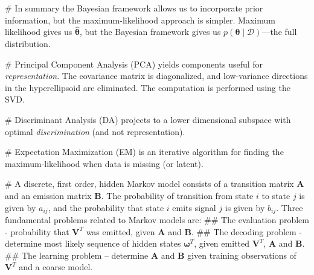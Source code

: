 \documentclass[12pt, a4paper]{article}
\newcommand{\D}{\mathcal{D}}
\newcommand{\vect}[1]{\bm{#1}}
\begin{document}
\begin{easylist}[itemize]
# In summary the Bayesian framework allows us to incorporate prior information, but the maximum-likelihood approach is simpler.
Maximum likelihood gives us $\hat{\vect{\theta}}$, but the Bayesian framework gives us $p(\vect{\theta}  \mid  \D)$---the full distribution.

# Principal Component Analysis (PCA) yields components useful for \emph{representation}.
The covariance matrix is diagonalized, and low-variance directions in the hyperellipsoid are eliminated.
The computation is performed using the SVD.

# Discriminant Analysis (DA) projects to a lower dimensional subspace with optimal \emph{discrimination} (and not representation).

# Expectation Maximization (EM) is an iterative algorithm for finding the maximum-likelihood when data is missing (or latent).

# A discrete, first order, hidden Markov model consists of a transition matrix $\vect{A}$ and an emission matrix $\vect{B}$.
The probability of transition from state $i$ to state $j$ is given by $a_{ij}$, and the probability that state $i$ emits signal $j$ is given by $b_{ij}$.
Three fundamental problems related to Markov models are:
## The evaluation problem - probability that $\vect{V}^T$ was emitted, given $\vect{A}$ and $\vect{B}$.
## The decoding problem - determine most likely sequence of hidden states $\vect{\omega}^T$, given emitted $\vect{V}^T$, $\vect{A}$ and $\vect{B}$.
## The learning problem -- determine $\vect{A}$ and $\vect{B}$ given training observations of $\vect{V}^T$ and a coarse model.

\end{easylist}
\end{document}
